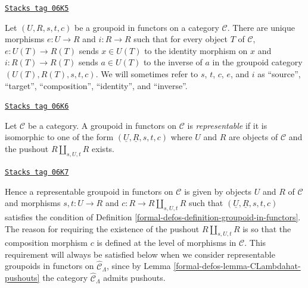 \begin{remark}
\label{formal-defos-remark-identity-inverse}
\href{https://stacks.math.columbia.edu/tag/06K5}{\texttt{Stacks tag 06K5}}

Let $(U, R, s, t, c)$ be a groupoid in functors on a category $\mathcal{C}$.
There are unique morphisms $e : U \to R$ and $i : R \to R$ such that
for every object $T$ of $\mathcal{C}$, $e: U(T) \to R(T)$ sends
$x \in U(T)$ to the identity morphism on $x$ and $i: R(T) \to R(T)$ sends
$a \in U(T)$ to the inverse of $a$ in the groupoid category
$(U(T), R(T), s, t, c)$. We will sometimes refer to $s$, $t$, $c$, $e$,
and $i$ as ``source'', ``target'', ``composition'', ``identity'', and
``inverse''.
\end{remark}

\begin{definition}[Representable]
\label{formal-defos-definition-representable}
\href{https://stacks.math.columbia.edu/tag/06K6}{\texttt{Stacks tag 06K6}}

Let $\mathcal{C}$ be a category. A groupoid in functors on $\mathcal{C}$ is
{\it representable} if it is isomorphic to one of the form
$(\underline{U}, \underline{R}, s, t, c)$ where $U$ and $R$ are objects of
$\mathcal{C}$ and the pushout $R \amalg_{s, U, t} R$ exists.
\end{definition}

\begin{remark}
\label{formal-defos-remark-reason-existence-coproduct}
\href{https://stacks.math.columbia.edu/tag/06K7}{\texttt{Stacks tag 06K7}}

Hence a representable groupoid in functors on $\mathcal{C}$ is given by
objects $U$ and $R$ of $\mathcal{C}$ and morphisms $s, t : U \to R$ and
$c : R \to R \amalg_{s, U, t} R$ such that
$(\underline{U}, \underline{R}, s, t, c)$ satisfies the condition of
Definition \ref{formal-defos-definition-groupoid-in-functors}. The reason for requiring
the existence of the pushout $R \amalg_{s, U, t} R$ is so that the composition
morphism $c$ is defined at the level of morphisms in $\mathcal{C}$.
This requirement will always be satisfied below when we consider
representable groupoids in functors on
$\widehat{\mathcal{C}}_\Lambda$, since by
Lemma \ref{formal-defos-lemma-CLambdahat-pushouts}
the category $\widehat{\mathcal{C}}_\Lambda$ admits pushouts.
\end{remark}

